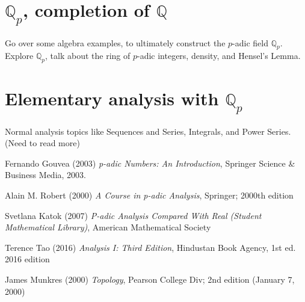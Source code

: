 \documentclass[12pt]{article}
\theoremstyle{definition}
\theoremstyle{remark}
\newcommand{\qq}{\mathbb Q}   %
\begin{document}
\section{$\qq_p$, completion of $\qq$ }
Go over some algebra examples, to ultimately construct the $p$-adic field $\qq_p$. Explore $\qq_p$, talk about the ring of $p$-adic integers, density, and Hensel's Lemma. 

\section{Elementary analysis with $\qq_p$}
Normal analysis topics like Sequences and Series, Integrals, and Power Series. (Need to read more)
\newpage
\begin{thebibliography}{9}
    Fernando Gouvea (2003) \emph{p-adic Numbers: An Introduction}, Springer Science \& Business Media, 2003.
    
    Alain M. Robert (2000) \emph{A Course in p-adic Analysis}, Springer; 2000th edition

    Svetlana Katok (2007) \emph{P-adic Analysis Compared With Real (Student Mathematical Library)}, American Mathematical Society
    
    Terence Tao (2016) \emph{Analysis I: Third Edition}, Hindustan Book Agency, 1st ed. 2016 edition

    James Munkres (2000) \emph{Topology}, Pearson College Div; 2nd edition (January 7, 2000)
  \end{thebibliography}
\end{document}
